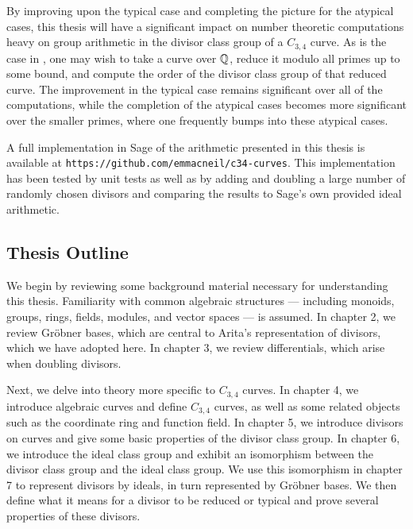 \begin{table}
  \label{tab_op_count_intro}
\end{table}

By improving upon the typical case and completing the picture for the atypical cases,
this thesis will have a significant impact on number theoretic computations
heavy on group arithmetic in the divisor class group of a $C_{3,4}$ curve.
As is the case in \cite{sutherland16}, 
one may wish to take a curve over $\mathbb{Q}$, reduce it modulo all primes up to some bound,
and compute the order of the divisor class group of that reduced curve.
The improvement in the typical case remains significant over all of the computations,
while the completion of the atypical cases becomes more significant over the smaller primes,
where one frequently bumps into these atypical cases.

A full implementation in Sage of the arithmetic presented in this thesis is available at {\tt https://github.com/emmacneil/c34-curves}.
This implementation has been tested by unit tests as well as by adding and doubling a large number of randomly chosen divisors
and comparing the results to Sage's own provided ideal arithmetic.




\subsection{Thesis Outline}


We begin by reviewing some background material necessary for understanding this thesis.
Familiarity with common algebraic structures ---
including monoids, groups, rings, fields, modules, and vector spaces --- is assumed.
In chapter 2, we review Gr\"obner bases,
which are central to Arita's representation of divisors,
which we have adopted here.
In chapter 3, we review differentials, which arise when doubling divisors.

Next, we delve into theory more specific to $C_{3,4}$ curves.
In chapter 4, we introduce algebraic curves and define $C_{3,4}$ curves,
as well as some related objects such as the coordinate ring and function field.
In chapter 5, we introduce divisors on curves and give some basic properties of the divisor class group.
In chapter 6, we introduce the ideal class group and exhibit an isomorphism between the divisor class group and the ideal class group.
We use this isomorphism in chapter 7 to represent divisors by ideals, in turn represented by Gr\"obner bases.
We then define what it means for a divisor to be reduced or typical
and prove several properties of these divisors.

